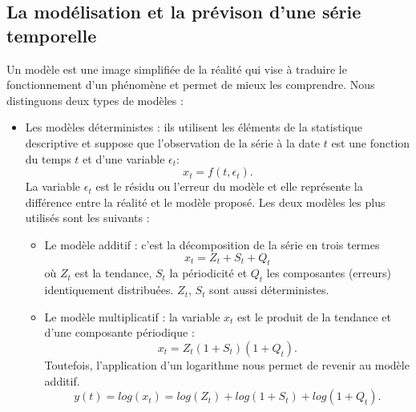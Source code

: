 \subsection{La mod\'elisation et la pr\'evison d'une s\'erie temporelle}
Un mod\`ele est une image simplifi\'ee de la r\'ealit\'e qui vise \`a traduire le fonctionnement d'un ph\'enom\`ene et permet de mieux les comprendre.
Nous distinguons deux types de mod\`eles :
\begin{itemize}
	\item Les mod\`eles d\'eterministes : ils utilisent les \'el\'ements de la statistique descriptive et suppose que l'observation de la s\'erie \`a la date $t$ est une fonction du temps $t$ et d'une variable $\epsilon_t$: 
	$$x_t = f(t, \epsilon_{t}).$$ 
	La variable $\epsilon_t$ est le r\'esidu ou l'erreur du mod\`ele et elle repr\'esente la diff\'erence entre la r\'ealit\'e et le mod\`ele propos\'e. 
	\newline
	Les deux mod\`eles les plus utilis\'es sont les suivants :
	\begin{itemize}
		\item Le mod\`ele additif : c'est la d\'ecomposition de la s\'erie en trois termes
			$$x_t = Z_t + S_t + Q_t $$ o\`u $Z_t$ est la tendance, $S_t$ la p\'eriodicit\'e et $Q_t$ les composantes (erreurs) identiquement distribu\'ees. $Z_t$, $S_t$ sont aussi d\'eterministes.
		\item Le mod\`ele multiplicatif : la variable $x_t$  est le produit de la tendance et d'une composante p\'eriodique :
		$$x_t = Z_t(1 + S_t)(1 + Q_t).$$
		Toutefois, l'application d'un logarithme nous permet de revenir au mod\`ele additif.
		$$y(t) = log(x_t) = log(Z_t) +log(1 + S_t) + log(1 + Q_t).$$
	\end{itemize}


\end{itemize}
